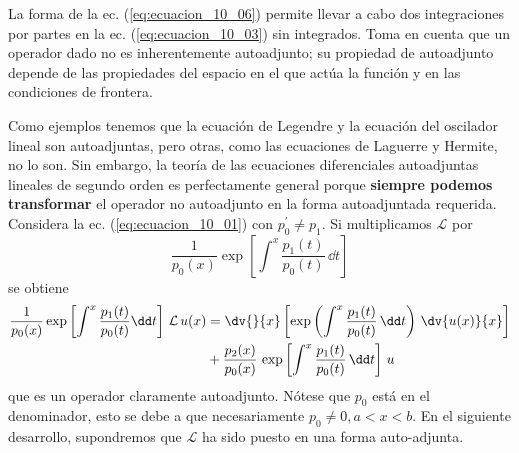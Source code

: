 \par
La forma de la ec. (\ref{eq:ecuacion_10_06}) permite llevar a cabo dos integraciones por partes en la ec. (\ref{eq:ecuacion_10_03}) sin integrados. Toma en cuenta que un operador dado no es inherentemente autoadjunto; su propiedad de autoadjunto depende de las propiedades del espacio en el que actúa la función y en las condiciones de frontera.
\par
Como ejemplos tenemos que la ecuación de Legendre y la ecuación del oscilador lineal son autoadjuntas, pero otras, como las ecuaciones de Laguerre y Hermite, no lo son. Sin embargo, la teoría de las ecuaciones diferenciales autoadjuntas lineales de segundo orden es perfectamente general porque \textbf{siempre podemos transformar} el operador no autoadjunto en la forma autoadjuntada requerida. Considera la ec. (\ref{eq:ecuacion_10_01}) con $p_{0}^{\prime} \neq p_{1}$. Si multiplicamos $\mathcal{L}$ por
\[ \dfrac{1}{p_{0}(x)} \exp \left[ \int^{x} \dfrac{p_{1}(t)}{p_{0}(t)} \, \dd t \right] \]
se obtiene
\begin{align}
\begin{aligned}
\dfrac{1}{p_{0}(x)} \exp \left[ \int^{x} \dfrac{p_{1}(t)}{p_{0}(t)} \dd t \right] \, \mathcal{L} \, u(x) &= \dv{}{x} \left[ \exp \left( \int^{x} \dfrac{p_{1}(t)}{p_{0}(t)} \, \dd t \right) \, \dv{u(x)}{x} \right] \\
&+ \dfrac{p_{2}(x)}{p_{0}(x)} \, \exp \left[ \int^{x} \dfrac{p_{1}(t)}{p_{0}(t)} \, \dd t \right] \, u
\end{aligned}
\label{eq:ecuacion_10_07}
\end{align}
 que es un operador claramente autoadjunto. Nótese que $p_{0}$ está en el denominador, esto se debe a que necesariamente $p_{0} \neq 0, a < x < b$. En el siguiente desarrollo, supondremos que $\mathcal{L}$ ha sido puesto en una forma auto-adjunta.
